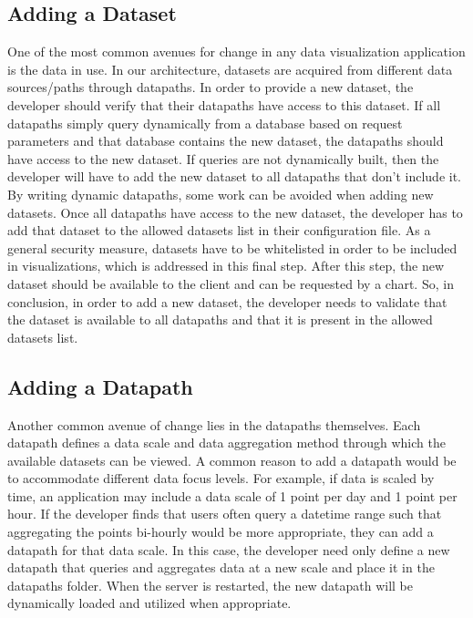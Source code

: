 %
%

\subsection{Adding a Dataset}

One of the most common avenues for change in any data visualization application is the data in use.  In our architecture, datasets are acquired from different data sources/paths through datapaths.  In order to provide a new dataset, the developer should verify that their datapaths have access to this dataset.  If all datapaths simply query dynamically from a database based on request parameters and that database contains the new dataset, the datapaths should have access to the new dataset.  If queries are not dynamically built, then the developer will have to add the new dataset to all datapaths that don’t include it.  By writing dynamic datapaths, some work can be avoided when adding new datasets.  Once all datapaths have access to the new dataset, the developer has to add that dataset to the allowed datasets list in their configuration file.  As a general security measure, datasets have to be whitelisted in order to be included in visualizations, which is addressed in this final step.  After this step, the new dataset should be available to the client and can be requested by a chart.  So, in conclusion, in order to add a new dataset, the developer needs to validate that the dataset is available to all datapaths and that it is present in the allowed datasets list. \par

\subsection{Adding a Datapath}
Another common avenue of change lies in the datapaths themselves.  Each datapath defines a data scale and data aggregation method through which the available datasets can be viewed.  A common reason to add a datapath would be to accommodate different data focus levels.  For example, if data is scaled by time, an application may include a data scale of 1 point per day and 1 point per hour.  If the developer finds that users often query a datetime range such that aggregating the points bi-hourly would be more appropriate, they can add a datapath for that data scale. In this case, the developer need only define a new datapath that queries and aggregates data at a new scale and place it in the datapaths folder.  When the server is restarted, the new datapath will be dynamically loaded and utilized when appropriate. \par

